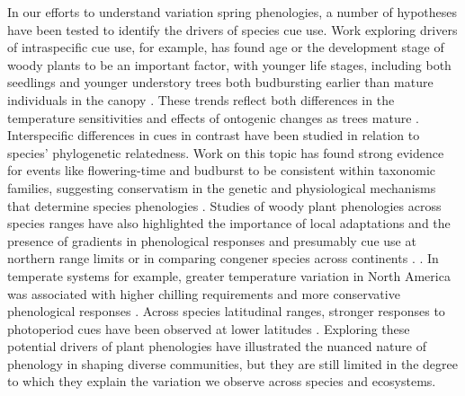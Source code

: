 \documentclass{article}\usepackage[]{graphicx}\usepackage[]{color}
\begin{document}
In our efforts to understand variation spring phenologies, a number of hypotheses have been tested to identify the drivers of species cue use. Work exploring drivers of intraspecific cue use, for example, has found age or the development stage of woody plants to be an important factor, with younger life stages, including both seedlings and younger understory trees both budbursting earlier than mature individuals in the canopy \citep{Vitasse2013, Seiwa1999}. These trends reflect both differences in the temperature sensitivities and effects of ontogenic changes as trees mature \citep{Vitasse2013, Seiwa1999}. Interspecific differences in cues in contrast have been studied in relation to species' phylogenetic relatedness. Work on this topic has found strong evidence for events like flowering-time and budburst to be consistent within taxonomic families, suggesting conservatism in the genetic and physiological mechanisms that determine species phenologies \citep{Kochmer1986, Davies2013, Gougherty2018}. Studies of woody plant phenologies across species ranges have also highlighted the importance of local adaptations and the presence of gradients in phenological responses and presumably cue use at northern range limits or in comparing congener species across continents \citep{Lechowicz1984, Chuine2001, Chuine2010}. \citep{Zohner2017}. In temperate systems for example, greater temperature variation in North America was associated with higher chilling requirements and more conservative phenological responses \citep{Zohner2017}.  Across species latitudinal ranges, stronger responses to photoperiod cues have been observed at lower latitudes \citep{Zohner2016}. Exploring these potential drivers of plant phenologies have illustrated the nuanced nature of phenology in shaping diverse communities, but they are still limited in the degree to which they explain the variation we observe across species and ecosystems.
\end{document}
